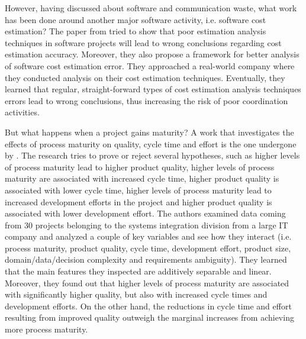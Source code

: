 \documentclass{mprop}
\begin{document}
However, having discussed about software and communication waste, what work has been done
around another major software activity, i.e. software cost estimation? The paper from 
\citet{grimstad2006framework} tried to show that poor estimation analysis techniques
in software projects will lead to wrong conclusions regarding cost estimation accuracy.
Moreover, they also propose a framework for better analysis of software cost estimation
error. They approached a real-world company where they conducted analysis on their cost
estimation techniques. Eventually, they learned that regular, straight-forward types
of cost estimation analysis techniques errors lead to wrong conclusions, thus increasing
the risk of poor coordination activities.

But what happens when a project gains maturity? A work that investigates the effects of process
maturity on quality, cycle time and effort is the one undergone by \citet{harter2000effects}. The
research tries to prove or reject several hypotheses, such as higher levels of process maturity lead 
to higher product quality, higher levels of process maturity are associated with increased cycle time,
higher product quality is associated with lower cycle time, higher levels of process maturity lead 
to increased development efforts in the project and higher product quality is associated with lower
development effort. The authors examined data coming from 30 projects belonging to the systems 
integration division from a large IT company and analyzed a couple of key variables and see how
they interact (i.e. process maturity, product quality, cycle time, development effort, product
size, domain/data/decision complexity and requirements ambiguity). They learned that the main
features they inspected are additively separable and linear. Moreover, they found out that 
higher levels of process maturity are associated with significantly higher quality, but also
with increased cycle times and development efforts. On the other hand, the reductions in cycle
time and effort resulting from improved quality outweigh the marginal increases from achieving
more process maturity. 
\end{document}
